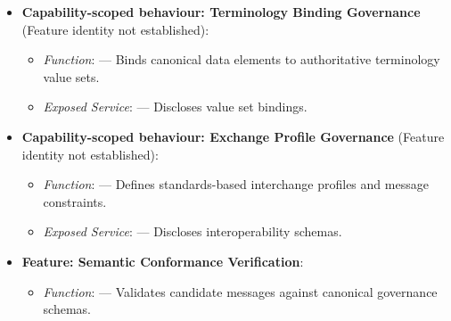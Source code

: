 \begin{itemize}
\begin{itemize}
\begin{itemize}
\item 
\emph{Exposed Service}: \texttt{} — Provides data dictionary specifications.



\end{itemize}


\item 
\textbf{Capability-scoped behaviour: Terminology Binding Governance} (Feature identity not established):


\begin{itemize}

\item 
\emph{Function}: \texttt{} — Binds canonical data elements to authoritative terminology value sets.



\item 
\emph{Exposed Service}: \texttt{} — Discloses value set bindings.



\end{itemize}


\item 
\textbf{Capability-scoped behaviour: Exchange Profile Governance} (Feature identity not established):


\begin{itemize}

\item 
\emph{Function}: \texttt{} — Defines standards-based interchange profiles and message constraints.



\item 
\emph{Exposed Service}: \texttt{} — Discloses interoperability schemas.



\end{itemize}


\item 
\textbf{Feature: Semantic Conformance Verification}:


\begin{itemize}

\item 
\emph{Function}: \texttt{} — Validates candidate messages against canonical governance schemas.




\end{itemize}
\end{itemize}
\end{itemize}
